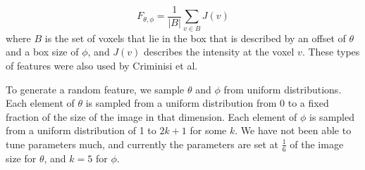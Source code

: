 \begin{equation}
  F_{\theta, \phi} = \frac{1}{|B|} \sum_{v \in B} J(v)
\end{equation}
where $B$ is the set of voxels that lie in the box that is described by an offset of $\theta$ and a box size of $\phi$, and $J(v)$ describes the intensity at the voxel $v$. These types of features were also used by Criminisi et al.

To generate a random feature, we sample $\theta$ and $\phi$ from uniform distributions. Each element of $\theta$ is sampled from a uniform distribution from 0 to a fixed fraction of the size of the image in that dimension. Each element of $\phi$ is sampled from a uniform distribution of 1 to $2k+1$ for some $k$. We have not been able to tune parameters much, and currently the parameters are set at $\frac{1}{6}$ of the image size for $\theta$, and $k = 5$ for $\phi$. 



